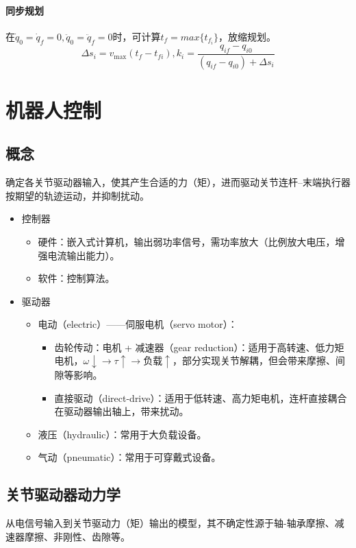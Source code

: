 \documentclass[
12pt, %
a4paper, 
oneside, %
headinclude,footinclude, %
]{scrartcl}
\begin{document}
\paragraph{同步规划}
在$ \dot{q}_0 = \dot{q}_f = 0, \ddot{q}_0 = \ddot{q}_f = 0 $时，可计算$ t_f = max\{t_{f_i}\} $，放缩规划。
$$ \Delta s_i = v_{\max}(t_f - t_{fi}), k_i = \frac{q_{if} - q_{i0}}{(q_{if} - q_{i0}) + \Delta s_i} $$
\section{机器人控制}
\subsection[概念]{概念}
确定各关节驱动器输入，使其产生合适的力（矩），进而驱动关节连杆--末端执行器按期望的轨迹运动，并抑制扰动。
\begin{itemize}
\item 控制器
\begin{itemize}
\item 硬件：嵌入式计算机，输出弱功率信号，需功率放大（比例放大电压，增强电流输出能力）。
\item 软件：控制算法。
\end{itemize}
\item 驱动器
\begin{itemize}
\item 电动（electric）——伺服电机（servo motor）：
\begin{itemize}
\item 齿轮传动：电机 + 减速器（gear reduction）：适用于高转速、低力矩电机，$ \omega \downarrow \rightarrow \tau \uparrow \rightarrow \text{负载} \uparrow $，部分实现关节解耦，但会带来摩擦、间隙等影响。
\item 直接驱动（direct-drive）：适用于低转速、高力矩电机，连杆直接耦合在驱动器输出轴上，带来扰动。
\end{itemize}
\item 液压（hydraulic）：常用于大负载设备。
\item 气动（pneumatic）：常用于可穿戴式设备。
\end{itemize}
\end{itemize}
\subsection[关节驱动器动力学]{关节驱动器动力学}
从电信号输入到关节驱动力（矩）输出的模型，其不确定性源于轴-轴承摩擦、减速器摩擦、非刚性、齿隙等。
\end{document}
